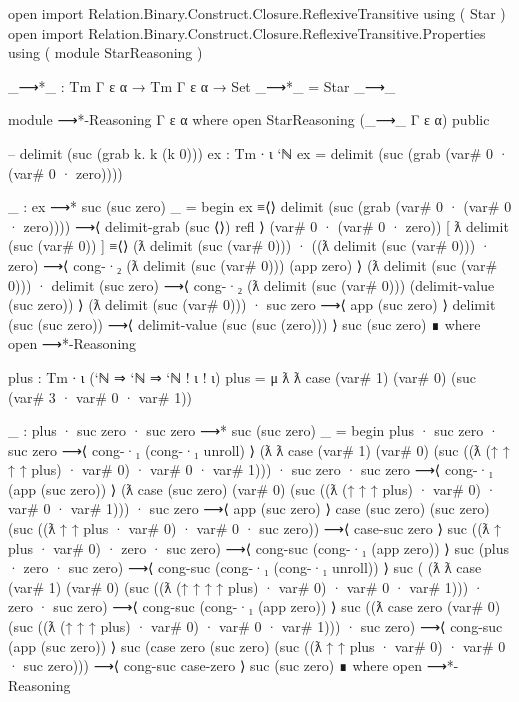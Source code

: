 \begin{code}
open import Relation.Binary.Construct.Closure.ReflexiveTransitive using ( Star )
open import Relation.Binary.Construct.Closure.ReflexiveTransitive.Properties
  using ( module StarReasoning )

_⟶*_ : Tm Γ ε α → Tm Γ ε α → Set
_⟶*_ = Star _⟶_

module ⟶*-Reasoning {Γ ε α} where
  open StarReasoning (_⟶_ {Γ} {ε} {α}) public
\end{code}

\begin{code}
-- delimit (suc (grab k. k (k 0)))
ex : Tm ∙ ι `ℕ
ex = delimit (suc (grab (var# 0 · (var# 0 · zero))))

_ : ex ⟶* suc (suc zero)
_ =
  begin
    ex
  ≡⟨⟩
    delimit (suc (grab (var# 0 · (var# 0 · zero))))
  ⟶⟨ delimit-grab (suc ⟨⟩) refl ⟩
    (var# 0 · (var# 0 · zero)) [ ƛ delimit (suc (var# 0)) ]
  ≡⟨⟩
    (ƛ delimit (suc (var# 0))) · ((ƛ delimit (suc (var# 0))) · zero)
  ⟶⟨ cong-·₂ (ƛ delimit (suc (var# 0))) (app zero) ⟩
    (ƛ delimit (suc (var# 0))) · delimit (suc zero)
  ⟶⟨ cong-·₂ (ƛ delimit (suc (var# 0))) (delimit-value (suc zero)) ⟩
    (ƛ delimit (suc (var# 0))) · suc zero
  ⟶⟨ app (suc zero) ⟩
    delimit (suc (suc zero))
  ⟶⟨ delimit-value (suc (suc (zero))) ⟩
    suc (suc zero)
  ∎
  where open ⟶*-Reasoning

plus : Tm ∙ ι (`ℕ ⇒ `ℕ ⇒ `ℕ ! ι ! ι)
plus = μ ƛ ƛ case (var# 1) (var# 0) (suc (var# 3 · var# 0 · var# 1))

_ : plus · suc zero · suc zero ⟶* suc (suc zero)
_ =
  begin
    plus · suc zero · suc zero
  ⟶⟨ cong-·₁ (cong-·₁ unroll) ⟩
    (ƛ ƛ case (var# 1) (var# 0) (suc ((ƛ (↑ ↑ ↑ ↑ plus) · var# 0) · var# 0 · var# 1)))
      · suc zero
      · suc zero
  ⟶⟨ cong-·₁ (app (suc zero)) ⟩
    (ƛ case (suc zero) (var# 0) (suc ((ƛ (↑ ↑ ↑ plus) · var# 0) · var# 0 · var# 1)))
      · suc zero
  ⟶⟨ app (suc zero) ⟩
    case (suc zero) (suc zero) (suc ((ƛ ↑ ↑ plus · var# 0) · var# 0 · suc zero))
  ⟶⟨ case-suc zero ⟩
    suc ((ƛ ↑ plus · var# 0) · zero · suc zero)
  ⟶⟨ cong-suc (cong-·₁ (app zero)) ⟩
    suc (plus · zero · suc zero)
  ⟶⟨ cong-suc (cong-·₁ (cong-·₁ unroll)) ⟩
    suc (
      (ƛ ƛ case (var# 1) (var# 0) (suc ((ƛ (↑ ↑ ↑ ↑ plus) · var# 0) · var# 0 · var# 1)))
      · zero
      · suc zero)
  ⟶⟨ cong-suc (cong-·₁ (app zero)) ⟩
    suc ((ƛ case zero (var# 0) (suc ((ƛ (↑ ↑ ↑ plus) · var# 0) · var# 0 · var# 1))) · suc zero)
  ⟶⟨ cong-suc (app (suc zero)) ⟩
    suc (case zero (suc zero) (suc ((ƛ ↑ ↑ plus · var# 0) · var# 0 · suc zero)))
  ⟶⟨ cong-suc case-zero ⟩
    suc (suc zero)
  ∎
  where open ⟶*-Reasoning
\end{code}

